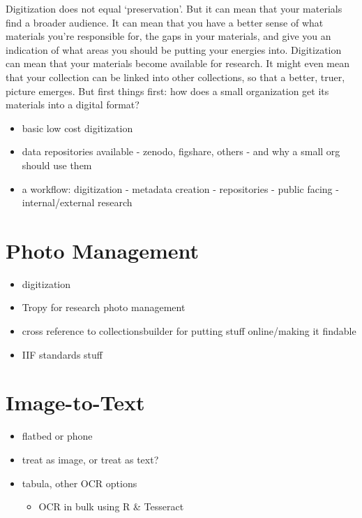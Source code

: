 \documentclass[
]{book}
\providecommand{\tightlist}{%
  \setlength{\itemsep}{0pt}\setlength{\parskip}{0pt}}
\begin{document}
Digitization does not equal `preservation'. But it can mean that your materials find a broader audience. It can mean that you have a better sense of what materials you're responsible for, the gaps in your materials, and give you an indication of what areas you should be putting your energies into. Digitization can mean that your materials become available for research. It might even mean that your collection can be linked into other collections, so that a better, truer, picture emerges. But first things first: how does a small organization get its materials into a digital format?

\begin{itemize}
\tightlist
\item
  basic low cost digitization
\item
  data repositories available - zenodo, figshare, others - and why a small org should use them
\item
  a workflow: digitization - metadata creation - repositories - public facing - internal/external research
\end{itemize}

\hypertarget{photos}{%
\section{Photo Management}\label{photos}}

\begin{itemize}
\tightlist
\item
  digitization
\item
  Tropy for research photo management
\item
  cross reference to collectionsbuilder for putting stuff online/making it findable
\item
  IIF standards stuff
\end{itemize}

\hypertarget{scanning}{%
\section{Image-to-Text}\label{scanning}}

\begin{itemize}
\tightlist
\item
  flatbed or phone
\item
  treat as image, or treat as text?
\item
  tabula, other OCR options

  \begin{itemize}
  \tightlist
  \item
    OCR in bulk using R \& Tesseract
  \end{itemize}
\end{itemize}
\end{document}
